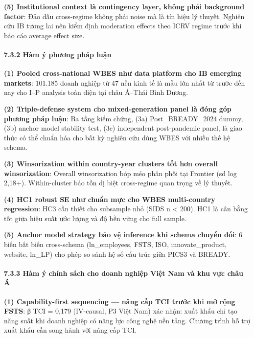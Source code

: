 \documentclass[12pt,a4paper]{article}
\begin{document}
\textbf{(5) Institutional context là contingency layer, không phải
background factor}: Đảo dấu cross-regime không phải noise mà là tín hiệu
lý thuyết. Nghiên cứu IB tương lai nên kiểm định moderation effects theo
ICRV regime trước khi báo cáo average effect size.

\hypertarget{732-huxe0m-uxfd-phux1b0ux1a1ng-phuxe1p-luux1eadn}{%
\paragraph{7.3.2 Hàm ý phương pháp
luận}\label{732-huxe0m-uxfd-phux1b0ux1a1ng-phuxe1p-luux1eadn}}

\textbf{(1) Pooled cross-national WBES như data platform cho IB emerging
markets}: 101.185 doanh nghiệp từ 47 nền kinh tế là mẫu lớn nhất từ
trước đến nay cho I--P analysis toàn diện tại châu Á--Thái Bình Dương.

\textbf{(2) Triple-defense system cho mixed-generation panel là đóng góp
phương pháp luận}: Ba tầng kiểm chứng, (3a) Post\_BREADY\_2024 dummy,
(3b) anchor model stability test, (3c) independent post-pandemic panel,
là giao thức có thể chuẩn hóa cho bất kỳ nghiên cứu dùng WBES với nhiều
thế hệ schema.

\textbf{(3) Winsorization within country-year clusters tốt hơn overall
winsorization}: Overall winsorization bóp méo phân phối tại Frontier (sd
log 2,18+). Within-cluster bảo tồn dị biệt cross-regime quan trọng về lý
thuyết.

\textbf{(4) HC1 robust SE như chuẩn mực cho WBES multi-country
regression}: HC3 cần thiết cho subsample nhỏ (SIDS n \textless{} 200).
HC1 là cân bằng tốt giữa hiệu suất ước lượng và độ bền vững cho full
sample.

\textbf{(5) Anchor model strategy bảo vệ inference khi schema chuyển
đổi}: 6 biến bất biến cross-schema (ln\_employees, FSTS, ISO,
innovate\_product, website, ln\_LP) cho phép so sánh hệ số cấu trúc giữa
PICS3 và BREADY.

\hypertarget{733-huxe0m-uxfd-chuxednh-suxe1ch-cho-doanh-nghiux1ec7p-viux1ec7t-nam-vuxe0-khu-vux1ef1c-chuxe2u-uxe1}{%
\paragraph{7.3.3 Hàm ý chính sách cho doanh nghiệp Việt Nam và khu vực
châu
Á}\label{733-huxe0m-uxfd-chuxednh-suxe1ch-cho-doanh-nghiux1ec7p-viux1ec7t-nam-vuxe0-khu-vux1ef1c-chuxe2u-uxe1}}

\textbf{(1) Capability-first sequencing --- nâng cấp TCI trước khi mở
rộng FSTS}: β TCI = 0,179 (IV-causal, P3 Việt Nam) xác nhận: xuất khẩu
chỉ tạo năng suất khi doanh nghiệp có năng lực công nghệ nền tảng.
Chương trình hỗ trợ xuất khẩu cần song hành với nâng cấp TCI.
\end{document}
